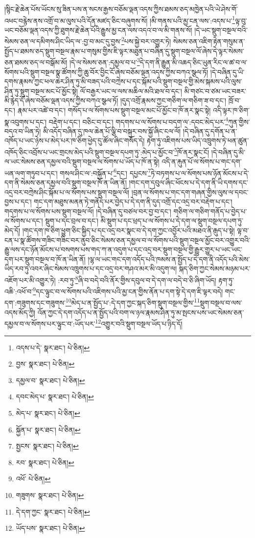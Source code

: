 །སྙིང་རྗེ་ཆེན་པོས་ཡོངས་སུ་ཟིན་པས་ན་སངས་རྒྱས་བཅོམ་ལྡན་འདས་ཀྱིས་ཐམས་ཅད་མཁྱེན་པའི་ཡེ་ཤེས་གོ་འཕང་བརྙེས་ནས་འགྲོ་བ་མ་ལུས་པའི་དོན་མཛད་ཅིང་བཞུགས་སོ། །མི་གནས་པའི་མྱ་ངན་ལས་:འདས་པ་\footnote{འདས་པ་དེ་  སྣར་ཐང་།  པེ་ཅིན། }ལྟ་བུ་ཡང་བཅོམ་ལྡན་འདས་ཀྱི་ཐུགས་རྗེ་ཆེན་པོའི་རྒྱུས་མྱ་ངན་ལས་འདའ་བ་ལ་མི་གནས་སོ། །དེ་ཡང་སྡུག་བསྔལ་བའི་སེམས་ཅན་ལ་དམིགས་ཤིང་ཡིད་ལ་:བྱ་བ་མང་དུ་བྱས་\footnote{བྱས་  སྣར་ཐང་།  པེ་ཅིན། }པས་སྐྱེ་བར་འགྱུར་ཏེ། སེམས་ཅན་འཇིག་རྟེན་གསུམ་ན་སྤྱོད་པ་ཐམས་ཅད་སྡུག་བསྔལ་རྣམ་པ་གསུམ་གྱིས་ཇི་ལྟར་མཐུན་པ་བཞིན་དུ་སྡུག་བསྔལ་ལོ་ཞེས་དེ་ལྟར་སེམས་ཅན་ཐམས་ཅད་ལ་བསྒོམ་མོ། །དེ་ལ་སེམས་ཅན་:དམྱལ་བ་པ་\footnote{དམྱལ་བ་  སྣར་ཐང་།  པེ་ཅིན། }དེ་དག་ནི་རྒྱུན་མི་འཆད་ཅིང་ཡུན་རིང་ལ་ཚ་བ་ལ་སོགས་པའི་སྡུག་བསྔལ་སྣ་ཚོགས་ཀྱི་ཆུ་བོར་བྱིང་ངོ་ཞེས་བཅོམ་ལྡན་འདས་ཀྱིས་བཀའ་སྩལ་ཏོ། །དེ་བཞིན་དུ་ཡི་དགས་རྣམས་ཀྱང་ཕལ་ཆེར་ཤིན་ཏུ་མི་བཟད་པའི་བཀྲེས་པ་དང་སྐོམ་པའི་སྡུག་བསྔལ་གྱི་མེས་སྐམས་པའི་ལུས་ཤིན་ཏུ་སྡུག་བསྔལ་མང་པོ་མྱོང་སྟེ། ལོ་བརྒྱར་ཡང་ལ་ལས་མཆིལ་མའི་ཐལ་བ་དང་། མི་གཙང་བ་ཙམ་ཡང་བཟར་མི་རྙེད་དོ་ཞེས་བཅོམ་ལྡན་འདས་ཀྱིས་བཀའ་སྩལ་ཏོ། །དུད་འགྲོ་རྣམས་ཀྱང་གཅིག་ལ་གཅིག་ཟ་བ་དང་། ཁྲོ་བ་དང་། རྣམ་པར་འཚེ་བ་དང་། གསོད་པ་ལ་སོགས་པས་སྡུག་བསྔལ་མང་པོ་མྱོང་བ་ཁོ་ནར་སྣང་སྟེ། འདི་ལྟར་ཁ་ཅིག་སྣ་འབུགས་པ་དང་། བརྡེག་པ་དང་། བཅིང་བ་དང་། གདགས་པ་ལ་སོགས་པ་བདག་ལ་:དབང་མེད་པར་\footnote{དབང་མེད་པ་  སྣར་ཐང་།  པེ་ཅིན། }ཀུན་གྱིས་བདའ་བ་ཡིན་ཏེ། མི་འདོད་བཞིན་དུ་ཁལ་ཆེན་པོ་ལྕི་བ་བསྐུར་བས་སྐྱོ་ཞིང་ངལ་ལོ། །དེ་བཞིན་དུ་དགོན་པ་ན་འཁོད་པ་ཡང་ཉེས་པ་མེད་པར་ཁ་ཅིག་ཕྱེད་དུ་ཚོལ་ཞིང་གསོད་དེ། རྟག་ཏུ་འཇིགས་པས་ཡིད་འཁྲུགས་ཏེ་ཕན་ཚུན་འཁོད་ཅིང་འབྲོས་པ་ཡང་གྲངས་མེད་པའི་སྡུག་བསྔལ་དཔག་ཏུ་:མེད་པ་མྱོང་བ་\footnote{མེད་པ་  སྣར་ཐང་།  པེ་ཅིན། }ཁོ་ནར་སྣང་ངོ། །དེ་བཞིན་དུ་མི་ལ་ཡང་སེམས་ཅན་དམྱལ་བའི་སྡུག་བསྔལ་ལ་སོགས་པ་ཡོད་པ་ཁོ་ན་སྟེ། འདི་ན་རྐུན་པོ་ལ་སོགས་པ་གང་དག་ཡན་ལག་གཏུབ་པ་དང་། གསལ་ཤིང་ལ་:བསྐྱོན་པ་\footnote{སྐྱོན་པ་  སྣར་ཐང་།  པེ་ཅིན། }དང་། དཔྱངས་\footnote{སྤྱངས་  སྣར་ཐང་།  པེ་ཅིན། }ཏེ་བཏགས་པ་ལ་སོགས་པས་ཉོན་མོངས་པ་དེ་དག་ནི་སེམས་ཅན་དམྱལ་བའི་སྡུག་བསྔལ་ཁོ་ན་ཡིན་ནོ། །གང་དག་དབུལ་ཞིང་ཕོངས་པ་དེ་དག་ནི་ཡི་དགས་དང་འདྲ་བར་བཀྲེས་ཤིང་སྐོམ་པ་ལ་སོགས་པས་སྡུག་བསྔལ་ལོ། །བྲན་ལ་སོགས་པ་གང་དག་གཞན་གྱིས་ལུས་ལ་དབང་བྱས་པ་དང་། གང་དག་མཐུས་མནན་ཏེ་གནོད་པར་བྱེད་པ་དེ་དག་ནི་དུད་འགྲོ་དང་འདྲ་བར་བརྡེག་པ་དང་། གདགས་པ་ལ་སོགས་པས་སྡུག་བསྔལ་ལོ། །དེ་བཞིན་དུ་བཙལ་བར་བྱ་བ་དང་། གཅིག་ལ་གཅིག་གནོད་པ་བྱེད་པ་ལ་སོགས་པ་དང་། སྡུག་པ་དང་བྲལ་བ་དང་། མི་སྡུག་པ་དང་ཕྲད་པ་ལ་སོགས་པ་དེ་དག་ལ་སྡུག་བསྔལ་དཔག་ཏུ་མེད་དོ། །གང་དག་ཁ་ཅིག་ཕྱུག་ཅིང་སྐྱིད་པ་དང་འདྲ་བར་སྣང་བ་དེ་དག་ཀྱང་འབྱོར་པའི་མཐའ་ནི་རྒུད་པ་སྟེ། ལྟ་བ་ངན་པ་སྣ་ཚོགས་གཟིང་གཟིང་བར་ནུབ་ཅིང་སེམས་ཅན་དམྱལ་བ་ལ་སོགས་པའི་སྡུག་བསྔལ་མྱོང་བར་འགྱུར་བའི་རྒྱུ་ལས་དང་ཉོན་མོངས་པ་བསགས་པས་གད་ཀ་ན་འདུག་པ་དང་འདྲ་བར་སྡུག་བསྔལ་གྱི་རྒྱུར་གྱུར་པ་ཡང་ཡང་དག་པར་སྡུག་བསྔལ་བ་ཁོ་ན་ཡིན་ནོ། །ལྷ་ལ་ཡང་གང་དག་འདོད་པའི་ཁམས་ན་སྤྱོད་པ་དེ་དག་ནི་འདོད་པའི་མེས་ཡིད་རབ་ཏུ་འབར་ཞིང་སེམས་འཁྲུགས་པ་དང་འདྲ་བར་གཤའ་མར་མི་འདུག་ལ། སྐད་ཅིག་ཀྱང་སེམས་མཉམ་པར་འཇོག་པར་མི་འགྱུར་ཏེ། :རབ་ཏུ་\footnote{རབ་  སྣར་ཐང་།  པེ་ཅིན། }ཞི་བ་བདེ་བའི་ནོར་གྱིས་དབུལ་བ་དེ་དག་ལ་བདེ་བ་ཅི་ཞིག་ཡོད། རྟག་ཏུ་འཆི་:འཕོ་བ་\footnote{འཕོ་  པེ་ཅིན། }དང་ལྟུང་བ་ལ་སོགས་པའི་འཇིགས་པའི་མྱ་ངན་གྱིས་ནོན་པ་དག་སྟེ་དེ་དག་ཇི་ལྟར་བདེ། གང་དག་:གཟུགས་དང་གཟུགས་\footnote{གཟུགས་  སྣར་ཐང་།  པེ་ཅིན། }མེད་པ་ན་སྤྱོད་པ་:དེ་དག་ཀྱང་སྐད་ཅིག་སྡུག་བསྔལ་གྱིས་\footnote{དེ་དག་ཀྱང་  སྣར་ཐང་།  པེ་ཅིན། }སྡུག་བསྔལ་བ་ལས་འདས་མོད་ཀྱི། འོན་ཀྱང་དེ་དག་འདོད་པ་ན་སྤྱོད་པའི་བག་ལ་ཉལ་རྣམས་ཤིན་ཏུ་མ་སྤངས་པས་ཡང་སེམས་ཅན་དམྱལ་བ་ལ་སོགས་པར་ལྟུང་བ་:ཡོད་པར་\footnote{ཡོད་པས་  སྣར་ཐང་།  པེ་ཅིན། }འགྱུར་བའི་སྡུག་བསྔལ་ཡོད་པ་ཉིད་དོ། 